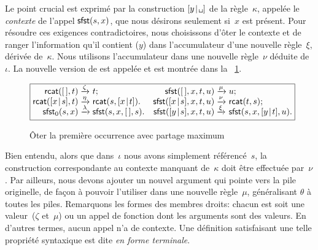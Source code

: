Le point crucial est exprimé par la construction
\(\cons{y}{\texttt{\textvisiblespace}}\) de la règle~\(\kappa\),
appelée le \emph{contexte}
de l'appel \(\textsf{sfst}(s,x)\), que nous
désirons seulement si~\(x\) est présent. Pour résoudre ces exigences
contradictoires, nous choisissons d'ôter le contexte et de ranger
l'information qu'il contient (\(y\)) dans l'accumulateur d'une nouvelle règle~\(\xi\), dérivée
de~\(\kappa\). Nous utilisons l'accumulateur dans une nouvelle
règle~\(\nu\) déduite de~\(\iota\). La nouvelle version de
 est appelée
 et est montrée dans
la \fig~\ref{fig:sfst0}.
\begin{figure}
\begin{equation*}
\boxed{%
\begin{array}{@{}r@{\;}l@{\;}lr@{\;}l@{\;}l@{}}
  \fun{rcat}(\el,t)              & \xrightarrow{\smash{\zeta}} & t; &
  \fun{sfst}(\el,x,t,u)          & \xrightarrow{\smash{\mu}} & u;\\
  \fun{rcat}(\cons{x}{s},t)      & \xrightarrow{\smash{\eta}}
                               & \fun{rcat}(s,\cons{x}{t}). &
\fun{sfst}(\cons{x}{s},x,t,u)  & \xrightarrow{\smash{\nu}}
                               & \fun{rcat}(t,s);\\
\fun{sfst}_0(s,x)              & \xrightarrow{\smash{\lambda}}
                               & \fun{sfst}(s,x,\el,s). &
\fun{sfst}(\cons{y}{s},x,t,u)  & \xrightarrow{\smash{\xi}}
                               & \fun{sfst}(s,x,\cons{y}{t},u).
\end{array}}
\end{equation*}
\caption{Ôter la première occurrence avec partage maximum}
\label{fig:sfst0}
\end{figure}

Bien entendu, alors que dans~\(\iota\) nous avons simplement
référencé~\(s\), la construction correspondante au contexte manquant
de~\(\kappa\) doit être effectuée par~\(\nu\). Par ailleurs, nous
devons ajouter un nouvel argument qui pointe vers la pile originelle,
de façon à pouvoir l'utiliser dans une nouvelle règle~\(\mu\),
généralisant \(\theta\) à toutes les piles. Remarquons les formes des
membres droits: chacun est soit une valeur~(\(\zeta\) et~\(\mu\)) ou
un appel de fonction dont les arguments sont des valeurs. En d'autres
termes, aucun appel n'a de contexte. Une définition satisfaisant une
telle propriété syntaxique est dite \emph{en forme
  terminale}.


